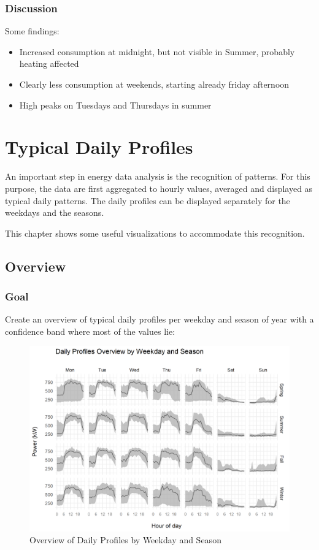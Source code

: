 \documentclass[
  a4paperpaper,
]{book}
\begin{document}
\hypertarget{discussion-6}{%
\subsection{Discussion}\label{discussion-6}}

Some findings:

\begin{itemize}
\item
  Increased consumption at midnight, but not visible in Summer, probably heating affected
\item
  Clearly less consumption at weekends, starting already friday afternoon
\item
  High peaks on Tuesdays and Thursdays in summer
\end{itemize}

\hypertarget{typical-daily-profiles}{%
\chapter{Typical Daily Profiles}\label{typical-daily-profiles}}

An important step in energy data analysis is the recognition of patterns. For this purpose, the data are first aggregated to hourly values, averaged and displayed as typical daily patterns. The daily profiles can be displayed separately for the weekdays and the seasons.

This chapter shows some useful visualizations to accommodate this recognition.

\newpage

\hypertarget{overview}{%
\section{Overview}\label{overview}}

\hypertarget{goal-8}{%
\subsection{Goal}\label{goal-8}}

Create an overview of typical daily profiles per weekday and season of year with a confidence band where most of the values lie:

\begin{figure}
\includegraphics[width=0.7\linewidth]{images/plotDailyProfOverview} \caption{Overview of Daily Profiles by Weekday and Season}\label{fig:unnamed-chunk-16}
\end{figure}
\end{document}
